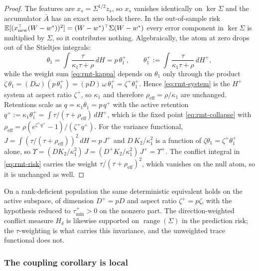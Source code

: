 \begin{proof}
The features are $x_s = \Sigma^{1/2} z_s$, so $x_s$ vanishes identically on $\ker\Sigma$ and the accumulator $\bar A$ has an exact zero block there.
In the out-of-sample risk $\mathbb{E}[(x_{\mathrm{new}}^\top(W-w^*))^2] = (W-w^*)^\top\Sigma(W-w^*)$ every error component in $\ker\Sigma$ is multiplied by $\Sigma$, so it contributes nothing.
Algebraically, the atom at zero drops out of the Stieltjes integrals:
\[
\theta_1 = \int \frac{\tau}{\kappa_1\tau+\rho}\,dH = p\,\theta_1^+,
\qquad \theta_1^+ := \int \frac{\tau}{\kappa_1\tau+\rho}\,dH^+,
\]
while the weight sum \eqref{eq:rmt-kappa} depends on $\theta_1$ only through the product
$\zeta\,\theta_1 = (D\omega)(p\,\theta_1^+) = (pD)\,\omega\,\theta_1^+ = \zeta^+ \theta_1^+$.
Hence \eqref{eq:rmt-system} is the $H^+$ system at aspect ratio $\zeta^+$, so $\kappa_1$ and therefore $\rho_{\mathrm{eff}} = \rho/\kappa_1$ are unchanged.
Retentions scale as $q = \kappa_1\theta_1 = p\,q^+$ with the active retention $q^+ := \kappa_1\theta_1^+ = \int \tau/(\tau+\rho_{\mathrm{eff}})\,dH^+$, which is the fixed point \eqref{eq:rmt-collapse} with $\rho_{\mathrm{eff}} = \rho (e^{\zeta^+ q^+}-1)/(\zeta^+ q^+)$.
For the variance functional, $J = \int (\tau/(\tau+\rho_{\mathrm{eff}}))^2\,dH = p\,J^+$ and $D\,K_2/\kappa_1^2$ is a function of $\zeta\theta_1 = \zeta^+\theta_1^+$ alone, so
$\Upsilon = (D K_2/\kappa_1^2)\,J = (D^+ K_2/\kappa_1^2)\,J^+ = \Upsilon^+$.
The conflict integral in \eqref{eq:rmt-risk} carries the weight $\tau/(\tau+\rho_{\mathrm{eff}})^2$, which vanishes on the null atom, so it is unchanged as well.
\end{proof}

On a rank-deficient population the same deterministic equivalent holds on the active subspace, of dimension $D^+ = pD$ and aspect ratio $\zeta^+ = p\zeta$, with the hypothesis reduced to $\tau_{\min}^+ > 0$ on the nonzero part.
The direction-weighted conflict measure $H_\delta$ is likewise supported on $\operatorname{range}(\Sigma)$ in the prediction risk; the $\tau$-weighting is what carries this invariance, and the unweighted trace functional does not.

\subsubsection{The coupling corollary is local}
\label{app:rmt-coupling}

